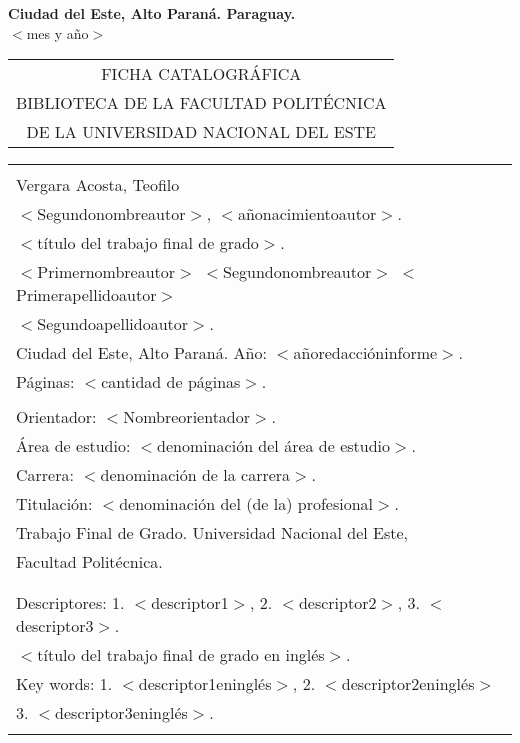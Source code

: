 \vspace{4.0cm}
\begin{center}
{\large {\bf Ciudad del Este, Alto Paraná. Paraguay.}\\[6mm]
$<$mes y año$>$}
\end{center}
\newpage \normalsize
\thispagestyle{empty}
\begin{center} 
\begin{tabular}{c} 
  FICHA CATALOGRÁFICA \\
  BIBLIOTECA DE LA FACULTAD POLITÉCNICA \\
  DE LA UNIVERSIDAD NACIONAL DEL ESTE \\
\end{tabular} %
\vspace{0.3cm}

\begin{tabular}{|l|} \hline %
\\
Vergara Acosta, Teofilo\\
$<$Segundonombreautor$>$, $<$añonacimientoautor$>$.\\
$<$título del trabajo final de grado$>$. \\
$<$Primernombreautor$>$ $<$Segundonombreautor$>$ $<$Primerapellidoautor$>$ \\
$<$Segundoapellidoautor$>$.\\
Ciudad del Este, Alto Paraná. Año: $<$añoredaccióninforme$>$.\\
Páginas: $<$cantidad de páginas$>$.\\ 
\\
Orientador: $<$Nombreorientador$>$. \\

Área de estudio: $<$denominación del área de estudio$>$. \\
Carrera: $<$denominación de la carrera$>$. \\
Titulación: $<$denominación del (de la) profesional$>$. \\

Trabajo Final de Grado. Universidad Nacional del Este, \\
Facultad Politécnica.\\
\\ \\

Descriptores: 1. $<$descriptor1$>$, 2. $<$descriptor2$>$, 3. $<$descriptor3$>$.\\
$<$título del trabajo final de grado en inglés$>$. \\
Key words: 1. $<$descriptor1eninglés$>$, 2. $<$descriptor2eninglés$>$ \\
\hspace{2cm} 3. $<$descriptor3eninglés$>$.\\
\\
\hline
\end{tabular}
\end{center}

